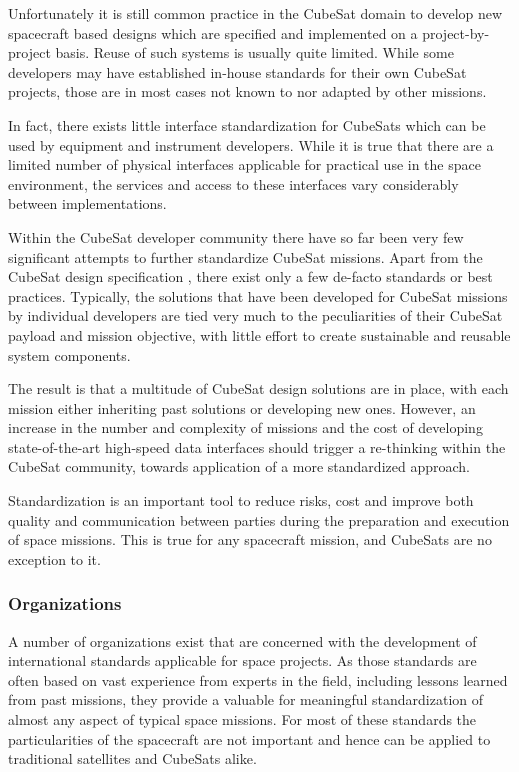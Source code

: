 Unfortunately it is still common practice in the CubeSat domain to develop new spacecraft based designs which are specified and implemented on a project-by-project basis. Reuse of such systems is usually quite limited. While some developers may have established in-house standards for their own CubeSat projects, those are in most cases not known to nor adapted by other missions.

In fact, there exists little interface standardization for CubeSats which can be used by equipment and instrument developers. While it is true that there are a limited number of physical interfaces applicable for practical use in the space environment, the services and access to these interfaces vary considerably between implementations.

Within the CubeSat developer community there have so far been very few significant attempts to further standardize CubeSat missions. Apart from the CubeSat design specification \cite{cubesat_design_specification}, there exist only a few de-facto standards or best practices. Typically, the solutions that have been developed for CubeSat missions by individual developers are tied very much to the peculiarities of their CubeSat payload and mission objective, with little effort to create sustainable and reusable system components.

The result is that a multitude of CubeSat design solutions are in place, with each mission either inheriting past solutions or developing new ones. However, an increase in the number and complexity of missions and the cost of developing state-of-the-art high-speed data interfaces should trigger a re-thinking within the CubeSat community, towards application of a more standardized approach.

Standardization is an important tool to reduce risks, cost and improve both quality and communication between parties during the preparation and execution of space missions. This is true for any spacecraft mission, and CubeSats are no exception to it.

\subsubsection{Organizations}

A number of organizations exist that are concerned with the development of international standards applicable for space projects. As those standards are often based on vast experience from experts in the field, including lessons learned from past missions, they provide a valuable for meaningful standardization of almost any aspect of typical space missions. For most of these standards the particularities of the spacecraft are not important and hence can be applied to traditional satellites and CubeSats alike.

